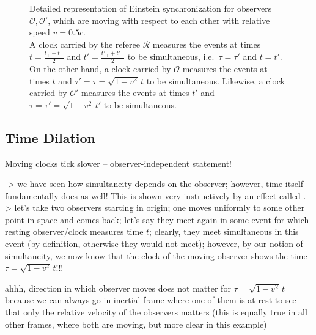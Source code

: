 \begin{figure}
\caption{Detailed representation of Einstein synchronization for observers $\mathcal{O}, \mathcal{O}'$, which are moving with respect to each other with relative speed $v = 0.5 c$.\\
A clock carried by the referee $\mathcal{R}$ measures the events at times $t = \frac{t_+ + t_-}{2}$ and $t' = \frac{t'_+ + t'_-}{2}$ to be simultaneous, i.e.~$\tau = \tau'$ and $t = t'$.\protect\footnotemark\\
On the other hand, a clock carried by $\mathcal{O}$ measures the events at times $t$ and $\tau' = \tau = \sqrt{1 - v^2} \, t$ to be simultaneous. Likewise, a clock carried by $\mathcal{O}'$ measures the events at times $t'$ and $\tau = \tau' = \sqrt{1 - v^2} \, t'$ to be simultaneous.}
\end{figure}




		\subsection{Time Dilation}
Moving clocks tick slower -- observer-independent statement!


-> we have seen how simultaneity depends on the observer; however, time itself fundamentally does as well! This is shown very instructively by an effect called . -> let's take two observers starting in origin; one moves uniformly to some other point in space and comes back; let's say they meet again in some event for which resting observer/clock measures time $t$; clearly, they meet simultaneous in this event (by definition, otherwise they would not meet); however, by our notion of simultaneity, we now know that the clock of the moving observer shows the time $\tau = \sqrt{1 - v^2} \, t$!!!


ahhh, direction in which observer moves does not matter for $\tau = \sqrt{1 - v^2} \, t$ because we can always go in inertial frame where one of them is at rest to see that only the relative velocity of the observers matters (this is equally true in all other frames, where both are moving, but more clear in this example)





